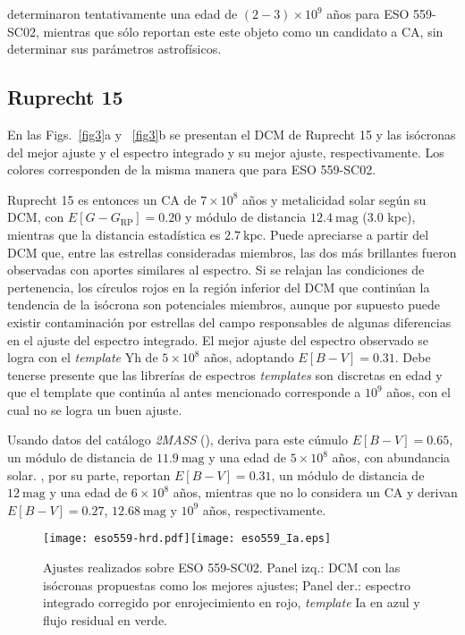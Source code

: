 \documentclass[baaa]{baaa}
\begin{document}
\cite{O18} determinaron tentativamente una edad de $(2 - 3) \times 10^9$ a\~nos para ESO 559-SC02, mientras que \cite{B19} s\'olo reportan este este objeto como un candidato a CA, sin determinar sus par\'ametros astrof\'isicos.

\subsection{Ruprecht 15}
En las Figs.~\ref{fig3}a y ~\ref{fig3}b se presentan el DCM de Ruprecht 15 y las is\'ocronas del mejor ajuste y el espectro integrado y su mejor ajuste, respectivamente. Los colores corresponden de la misma manera que para ESO 559-SC02.

Ruprecht 15 es entonces un CA de $7 \times 10^8$ a\~nos y metalicidad solar seg\'un su DCM, con $E[G - G_\textrm{RP}] = 0.20$ y m\'odulo de distancia $12.4~\mathrm{mag}$ (3.0 kpc), mientras que la distancia estad\'istica es $2.7~\mathrm{kpc}$. Puede apreciarse a partir del DCM que, entre las estrellas consideradas miembros, las dos m\'as brillantes fueron observadas con aportes similares al espectro. Si se relajan las condiciones de pertenencia, los c\'irculos rojos en la regi\'on inferior del DCM que contin\'uan la tendencia de la is\'ocrona son potenciales miembros, aunque por supuesto puede existir contaminaci\'on por estrellas del campo responsables de algunas diferencias en el ajuste del espectro integrado. El mejor ajuste del espectro observado se logra con el {\em template} Yh de $5 \times 10^8$ a\~nos, adoptando $E[B - V] = 0.31$. Debe tenerse presente que las librer\'ias de espectros {\em templates} son discretas en edad y que el template que contin\'ua al antes mencionado corresponde a $10^9$ a\~nos, con el cual no se logra un buen ajuste.

Usando datos del cat\'alogo {\sl 2MASS} (\citealt{S06}), \cite{T12} deriva para este c\'umulo $E[B - V] = 0.65$, un m\'odulo de distancia de $11.9~\mathrm{mag}$ y una edad de $5 \times 10^8$ a\~nos, con abundancia solar. \cite{K13}, por su parte, reportan $E[B - V] = 0.31$, un m\'odulo de distancia de $12~\mathrm{mag}$ y una edad de $6 \times 10^8$ a\~nos, mientras que \cite{P17} no lo considera un CA y \cite{L17} derivan $E[B - V] = 0.27$, $12.68~\mathrm{mag}$ y $10^9$ a\~nos, respectivamente.

\begin{figure}
    \centering
    \texttt{[image: eso559-hrd.pdf]}\texttt{[image: eso559\_Ia.eps]}
    \caption{Ajustes realizados sobre ESO 559-SC02. Panel izq.: DCM con las is\'ocronas propuestas como los mejores ajustes; Panel der.: espectro integrado corregido por enrojecimiento en rojo, {\em template} Ia en azul y flujo residual en verde.}
    \label{fig2}
\end{figure}
\end{document}
